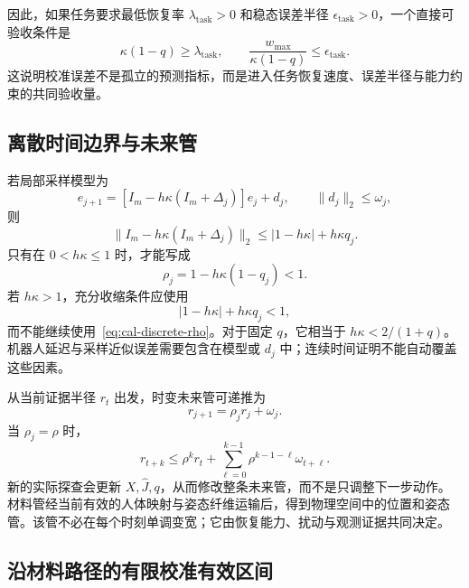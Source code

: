 \documentclass[11pt,a4paper]{article}
\numberwithin{equation}{section}
\theoremstyle{definition}
\begin{document}
因此，如果任务要求最低恢复率 $\lambda_{\mathrm{task}}>0$ 和稳态误差半径 $\epsilon_{\mathrm{task}}>0$，一个直接可验收条件是
\begin{equation}
  \kappa(1-q)\ge\lambda_{\mathrm{task}},
  \qquad
  \frac{w_{\max}}{\kappa(1-q)}
  \le\epsilon_{\mathrm{task}} .
  \label{eq:cal-task-rate}
\end{equation}
这说明校准误差不是孤立的预测指标，而是进入任务恢复速度、误差半径与能力约束的共同验收量。

\subsection{离散时间边界与未来管}

若局部采样模型为
\begin{equation}
  e_{j+1}=
  [I_m-h\kappa(I_m+\Delta_j)]e_j+d_j,
  \qquad\|d_j\|_2\le\omega_j,
\end{equation}
则
\begin{equation}
  \|I_m-h\kappa(I_m+\Delta_j)\|_2
  \le |1-h\kappa|+h\kappa q_j .
  \label{eq:cal-discrete-general}
\end{equation}
只有在 $0<h\kappa\le1$ 时，才能写成
\begin{equation}
  \rho_j=1-h\kappa(1-q_j)<1 .
  \label{eq:cal-discrete-rho}
\end{equation}
若 $h\kappa>1$，充分收缩条件应使用
\begin{equation}
  |1-h\kappa|+h\kappa q_j<1,
\end{equation}
而不能继续使用~\eqref{eq:cal-discrete-rho}。对于固定 $q$，它相当于 $h\kappa<2/(1+q)$。机器人延迟与采样近似误差需要包含在模型或 $d_j$ 中；连续时间证明不能自动覆盖这些因素。

从当前证据半径 $r_t$ 出发，时变未来管可递推为
\begin{equation}
  r_{j+1}=\rho_jr_j+\omega_j .
  \label{eq:cal-tube-recursion}
\end{equation}
当 $\rho_j=\rho$ 时，
\begin{equation}
  r_{t+k}
  \le\rho^kr_t+
  \sum_{\ell=0}^{k-1}
  \rho^{k-1-\ell}\omega_{t+\ell}.
  \label{eq:cal-future-tube}
\end{equation}
新的实际探查会更新 $X,\widehat J,q$，从而修改整条未来管，而不是只调整下一步动作。材料管经当前有效的人体映射与姿态纤维运输后，得到物理空间中的位置和姿态管。该管不必在每个时刻单调变宽；它由恢复能力、扰动与观测证据共同决定。

\subsection{沿材料路径的有限校准有效区间}
\end{document}
